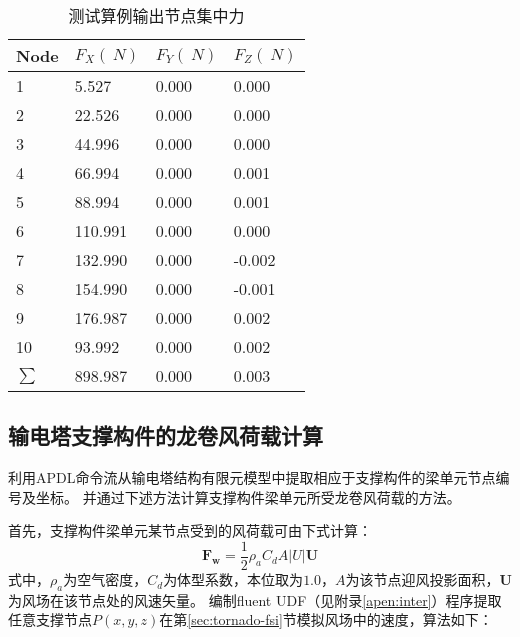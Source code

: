 \begin{table}[!htbp]
	\caption{测试算例输出节点集中力}
	\label{tab:example-force}
	\centering
	\begin{tabu} to 1.0\textwidth {X[c] X[2,c] X[2,c] X[2,c]}
		\toprule
		Node   & $F_X(\SI{}{N})$ & $F_Y(\SI{}{N})$ & $F_Z(\SI{}{N})$ \\
		      & 5.527           & 0.000           & 0.000           \\
		2      & 22.526          & 0.000           & 0.000           \\
		3      & 44.996          & 0.000           & 0.000           \\
		4      & 66.994          & 0.000           & 0.001           \\
		5      & 88.994          & 0.000           & 0.001           \\
		6      & 110.991         & 0.000           & 0.000           \\
		7      & 132.990         & 0.000           & -0.002          \\
		8      & 154.990         & 0.000           & -0.001          \\
		9      & 176.987         & 0.000           & 0.002           \\
		10     & 93.992          & 0.000           & 0.002           \\
		$\sum$ & 898.987         & 0.000           & 0.003           \\
		\bottomrule
	\end{tabu}
\end{table}

\subsection{输电塔支撑构件的龙卷风荷载计算}\label{sec:brace-load}
利用APDL命令流从输电塔结构有限元模型中提取相应于支撑构件的梁单元节点编号及坐标。
并通过下述方法计算支撑构件梁单元所受龙卷风荷载的方法。

首先，支撑构件梁单元某节点受到的风荷载可由下式计算\cite{savory2001modelling}：
\begin{equation}
	\bm{F_w} = \frac{1}{2} \rho_a C_d A |U| \bm{U}
\end{equation}
式中，$\rho_a$为空气密度，$C_d$为体型系数，本位取为$1.0$，$A$为该节点迎风投影面积，$\bm{U}$为风场在该节点处的风速矢量。
编制fluent UDF（见附录\ref{apen:inter}）程序提取任意支撑节点$P(x, y, z)$在第\ref{sec:tornado-fsi}节模拟风场中的速度，算法如下：

